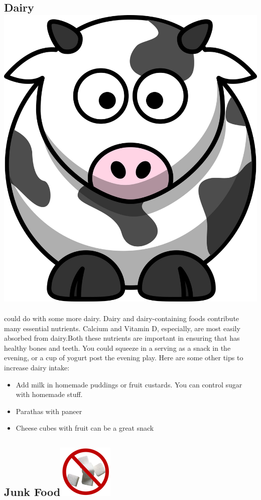 \documentclass[]{article}
\begin{document}
\subsection[Dairy]{\texorpdfstring{Dairy\protect\includegraphics{../Files/dairy.jpg}}{Dairy}}\label{dairy}

could do with some more dairy. Dairy and dairy-containing foods
contribute many essential nutrients. Calcium and Vitamin D, especially,
are most easily absorbed from dairy.Both these nutrients are important
in ensuring that has healthy bones and teeth. You could squeeze in a
serving as a snack in the evening, or a cup of yogurt post the evening
play. Here are some other tips to increase dairy intake:

\begin{itemize}
\item
  Add milk in homemade puddings or fruit custards. You can control sugar
  with homemade stuff.
\item
  Parathas with paneer
\item
  Cheese cubes with fruit can be a great snack
\end{itemize}

\subsection[Junk Food]{\texorpdfstring{Junk
Food\protect\includegraphics{../Files/sugar.png}}{Junk Food}}\label{junk-food}
\end{document}
